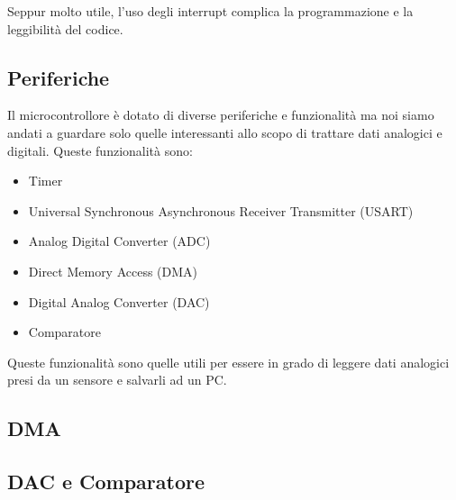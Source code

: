 Seppur molto utile, l'uso degli interrupt complica la programmazione e la leggibilità del codice.


\subsection{Periferiche}

Il microcontrollore è dotato di diverse periferiche e funzionalità ma noi siamo andati a guardare solo quelle interessanti allo scopo di trattare dati analogici e digitali. Queste funzionalità sono:
\begin{itemize}
    \item Timer
    \item Universal Synchronous Asynchronous Receiver Transmitter (USART)
    \item Analog Digital Converter (ADC)
    \item Direct Memory Access (DMA)
    \item Digital Analog Converter (DAC)
    \item Comparatore
\end{itemize}
Queste funzionalità sono quelle utili per essere in grado di leggere dati analogici presi da un sensore e salvarli ad un PC.







\subsection{DMA}

\subsection{DAC e Comparatore}